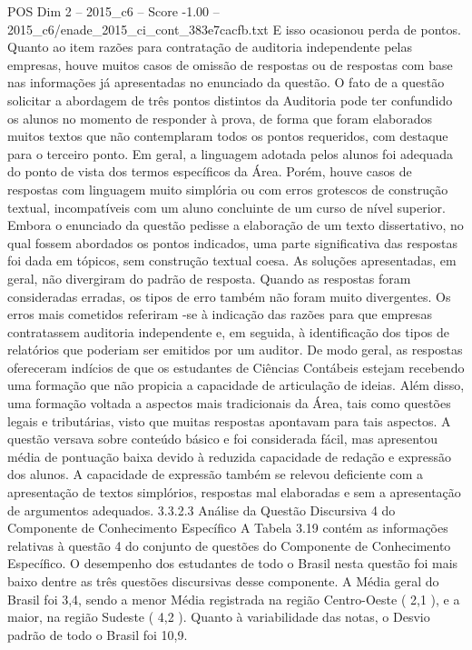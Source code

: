 \begin{textsample}{POS Dim 2 – 2015\_c6 – Score -1.00 – 2015\_c6/enade\_2015\_ci\_cont\_383e7cacfb.txt}
E isso ocasionou perda de pontos.
Quanto ao item razões para contratação de auditoria independente pelas empresas, houve muitos casos de omissão de respostas ou de respostas com base nas informações já apresentadas no enunciado da questão.
O fato de a questão solicitar a abordagem de três pontos distintos da Auditoria pode ter confundido os alunos no momento de responder à prova, de forma que foram elaborados muitos textos que não contemplaram todos os pontos requeridos, com destaque para o terceiro ponto.
Em geral, a linguagem adotada pelos alunos foi adequada do ponto de vista dos termos específicos da Área.
Porém, houve casos de respostas com linguagem muito simplória ou com erros grotescos de construção textual, incompatíveis com um aluno concluinte de um curso de nível superior.
Embora o enunciado da questão pedisse a elaboração de um texto dissertativo, no qual fossem abordados os pontos indicados, uma parte significativa das respostas foi dada em tópicos, sem construção textual coesa.
As soluções apresentadas, em geral, não divergiram do padrão de resposta.
Quando as respostas foram consideradas erradas, os tipos de erro também não foram muito divergentes.
Os erros mais cometidos referiram -se à indicação das razões para que empresas contratassem auditoria independente e, em seguida, à identificação dos tipos de relatórios que poderiam ser emitidos por um auditor.
De modo geral, as respostas ofereceram indícios de que os estudantes de Ciências Contábeis estejam recebendo uma formação que não propicia a capacidade de articulação de ideias.
Além disso, uma formação voltada a aspectos mais tradicionais da Área, tais como questões legais e tributárias, visto que muitas respostas apontavam para tais aspectos.
A questão versava sobre conteúdo básico e foi considerada fácil, mas apresentou média de pontuação baixa devido à reduzida capacidade de redação e expressão dos alunos.
A capacidade de expressão também se relevou deficiente com a apresentação de textos simplórios, respostas mal elaboradas e sem a apresentação de argumentos adequados. 3.3.2.3 Análise da Questão Discursiva 4 do Componente de Conhecimento Específico A Tabela 3.19 contém as informações relativas à questão 4 do conjunto de questões do Componente de Conhecimento Específico.
O desempenho dos estudantes de todo o Brasil nesta questão foi mais baixo dentre as três questões discursivas desse componente.
A Média geral do Brasil foi 3,4, sendo a menor Média registrada na região Centro-Oeste ( 2,1 ), e a maior, na região Sudeste ( 4,2 ).
Quanto à variabilidade das notas, o Desvio padrão de todo o Brasil foi 10,9.

\end{textsample}
